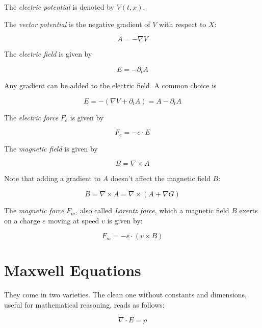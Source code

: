 \documentclass{article}
\begin{document}
The \emph{electric potential} is denoted by \(V(t, x)\). 

The \emph{vector potential} is the negative gradient of $V$ with respect to $X$:

\begin{equation}
A = -\nabla V
\end{equation}

The \emph{electric field} is given by

\begin{equation}
E = - \partial_t A
\end{equation}

Any gradient can be added to the electric field. 
A common choice is

\begin{equation}
E = - (\nabla V + \partial_t A)   = A - \partial_t A
\end{equation}

The \emph{electric force} $F_e$ is given by

\begin{equation}
F_e = - e \cdot E
\end{equation}


The \emph{magnetic field} is given by

\begin{equation}
B = \nabla \times A
\end{equation}

Note that adding a gradient to $A$ doesn't affect the magnetic field $B$:

\begin{equation}
 B = \nabla \times A = \nabla \times (A + \nabla G) 
\end{equation}

The \emph{magnetic force} $F_m$, also called \emph{Lorentz force}, which a magnetic field $B$ exerts on a charge $e$ moving at speed $v$ is given by:

\begin{equation}
F_m = - e \cdot (v \times B)
\end{equation}


\section{Maxwell Equations}

They come in two varieties. The clean one without constants and dimensions, useful for mathematical reasoning, reads as follows:

\begin{equation}
\label{eqn:M1}
\nabla \cdot E = \rho
\end{equation}
\end{document}

